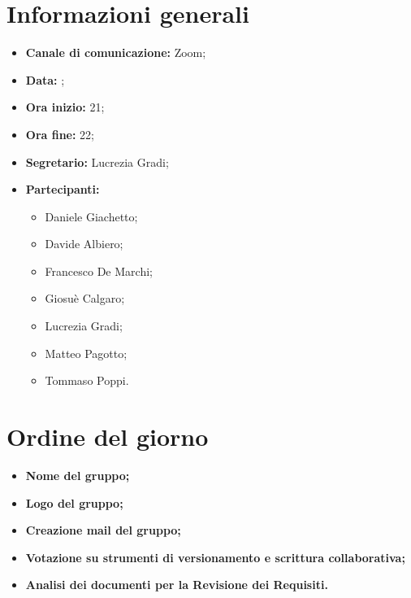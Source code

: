 \section{Informazioni generali}

\begin{itemize}

	\item \textbf{Canale di comunicazione:} Zoom;
	
	\item \textbf{Data:} \DataMeeting{};
	
	\item \textbf{Ora inizio:} 21;
	
	\item \textbf{Ora fine:} 22;
	
	\item \textbf{Segretario:} Lucrezia Gradi;
	
	\item \textbf{Partecipanti:}
	
		\begin{itemize}
		
			\item Daniele Giachetto;
			\item Davide Albiero;
			\item Francesco De Marchi;
			\item Giosuè Calgaro;
			\item Lucrezia Gradi;
			\item Matteo Pagotto;
			\item Tommaso Poppi.
				 
		\end{itemize}

\end{itemize}

\section{Ordine del giorno}

\begin{itemize}

	\item\textbf{Nome del gruppo;}

	\item\textbf{Logo del gruppo;}

	\item\textbf{Creazione mail del gruppo;}

	\item\textbf{Votazione su strumenti di versionamento e scrittura collaborativa;}
	
	\item\textbf{Analisi dei documenti per la Revisione dei Requisiti.}


\end{itemize}

